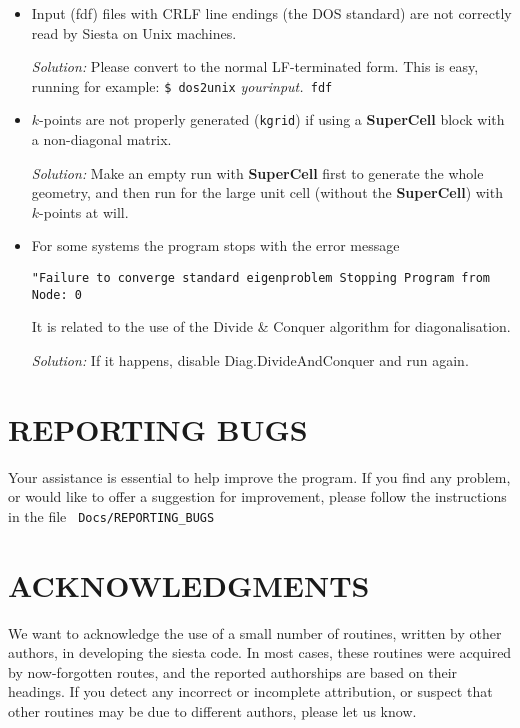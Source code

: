 \documentclass[11pt]{article}
\begin{document}
\begin{itemize}

\item
Input (fdf) files with CRLF line endings (the DOS standard) are not
correctly read by {\sc Siesta} on Unix machines.

{\it Solution:} Please convert to the normal LF-terminated form. This
is easy, running for example: {\tt \$ dos2unix} {\it yourinput.}{\tt
fdf}

\item
$k$-points are not properly generated ({\tt kgrid}) if using a
{\bf SuperCell} block with a non-diagonal matrix.

{\it Solution:} Make an empty run with {\bf SuperCell} first to generate
the whole geometry, and then run for the large unit cell (without the
{\bf SuperCell}) with $k$-points at will.

\item
For some systems the program stops with the error message

{\tt "Failure to converge standard eigenproblem
Stopping Program from Node:    0}

It is related to the use of the Divide \& Conquer algorithm for
diagonalisation.

{\it Solution:} If it happens, disable Diag.DivideAndConquer and run again.

\end{itemize}

\section{REPORTING BUGS}
 Your assistance is essential to help improve the
program. If you find any problem, or would like to offer a suggestion
for improvement, please follow the instructions in the file {\tt
  Docs/REPORTING\_BUGS}


\section{ACKNOWLEDGMENTS}

We want to acknowledge the use of a small number of routines,
written by other authors, in developing the siesta code.
In most cases, these routines were acquired by now-forgotten
routes, and the reported authorships are based on their headings.
If you detect any incorrect or incomplete attribution, or suspect
that other routines may be due to different authors, please
let us know.
\end{document}
